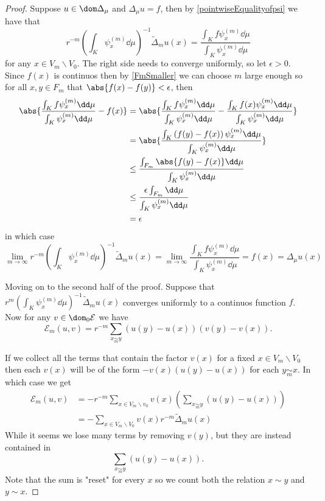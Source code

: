 \begin{proof}
	Suppose $u \in \dom \Delta_{\mu}$ and $\Delta_{\mu} u=f$, then by \cref{pointwiseEqualityofpsi} we have that 
	\begin{equation}
		r^{-m} \left(\int_{K} \psi^{(m)}_{x} \dd\mu \right)^{-1} \widetilde{\Delta}_m u(x) = \frac{\int_{K} f \psi_x^{(m)} \dd\mu}{\int_{K} \psi_x^{(m)} \dd\mu}
	\end{equation}
	for any $x \in V_m \backslash V_0$. The right side needs to converge uniformly, so let $\epsilon > 0$. Since $f(x)$ is continuos then by \cref{FmSmaller} we can choose $m$ large enough so for all $x, y \in F_m$ that $\abs{f(x) - f(y)} < \epsilon$, then
	\begin{align}
		\abs{\frac{\int_{K} f \psi_x^{(m)} \dd\mu}{\int_{K} \psi_x^{(m)} \dd\mu} - f(x)} &= \abs{\frac{\int_{K} f \psi_x^{(m)} \dd\mu}{\int_{K} \psi_x^{(m)} \dd\mu} - \frac{\int_{K} f(x) \psi_x^{(m)} \dd\mu}{\int_{K} \psi_x^{(m)} \dd\mu}} \\
		&= \abs{\frac{\int_{K} \left(f(y) -f(x) \right) \psi_x^{(m)} \dd\mu}{\int_{K} \psi_x^{(m)} \dd\mu}} \\
		&\leq \frac{\int_{F_m} \abs{f(y) -f(x)} \dd\mu}{\int_{K} \psi_x^{(m)} \dd\mu} \\
		&\leq \frac{\epsilon \int_{F_m} \dd\mu}{\int_{K} \psi_x^{(m)} \dd\mu} \\
		&= \epsilon
	\end{align}
	in which case
	\begin{equation}
		\lim_{m \to \infty} r^{-m} \left(\int_{K} \psi^{(m)}_{x} \dd\mu \right)^{-1} \widetilde{\Delta}_m u(x) = \lim_{m \to \infty} \frac{\int_{K} f \psi_x^{(m)} \dd \mu}{\int_{K} \psi_x^{(m)} \dd \mu} = f(x) = \Delta_{\mu} u(x)
	\end{equation}
	
	
	Moving on to the second half of the proof. Suppose that $r^{m} \left(\int_{K} \psi_x^{(m)} \dd \mu \right)^{-1} \widetilde{\Delta}_m u(x)$ converges uniformly to a continuos function $f$. Now for any $v \in \dom_0 \mathcal{E}$ we have 
	\begin{equation}
		\mathcal{E}_m(u,v) = r^{-m} \sum_{x \underset{m}{\sim} y} \left( u(y) - u(x) \right)\left(v(y) - v(x) \right).
	\end{equation}
	
	If we collect all the terms that contain the factor $v(x)$ for a fixed $x \in V_m \backslash V_0$ then each $v(x)$ will be of the form $-v(x) \left(u(y) - u(x) \right)$ for each $y \underset{m}{\sim} x$. In which case we get
	\begin{align}
		\mathcal{E}_m(u,v) &= - r^{-m}  \sum_{x \in V_m \backslash v_0} v(x) \left( \sum_{x \underset{m}{\sim} y} \left( u(y) - u(x) \right) \right) \\
		&= -\sum_{x \in V_m \backslash V_0} v(x) r^{-m} \widetilde{\Delta}_{m}u(x)
	\end{align}
	While it seems we lose many terms by removing $v(y)$, but they are instead contained in 
	$$\sum_{x \underset{m}{\sim} y} \left( u(y) - u(x) \right).$$ 
	Note that the sum is "reset" for every $x$ so we count both the relation $x \sim y$ and $y \sim x$.
	

\end{proof}
